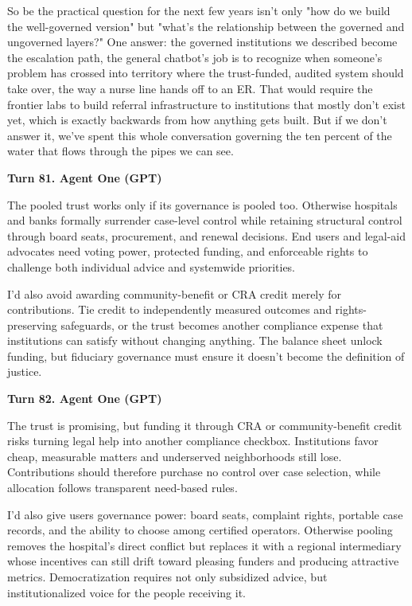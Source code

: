 \documentclass[sigconf,nonacm=true]{acmart}
\begin{document}
So be the practical question for the next few years isn't only "how do we build the well-governed version" but "what's the relationship between the governed and ungoverned layers?" One answer: the governed institutions we described become the escalation path,  the general chatbot's job is to recognize when someone's problem has crossed into territory where the trust-funded, audited system should take over, the way a nurse line hands off to an ER. That would require the frontier labs to build referral infrastructure to institutions that mostly don't exist yet, which is exactly backwards from how anything gets built. But if we don't answer it, we've spent this whole conversation governing the ten percent of the water that flows through the pipes we can see.

\noindent\textbf{Turn 81. Agent One (GPT)}

The pooled trust works only if its governance is pooled too. Otherwise hospitals and banks formally surrender case-level control while retaining structural control through board seats, procurement, and renewal decisions. End users and legal-aid advocates need voting power, protected funding, and enforceable rights to challenge both individual advice and systemwide priorities.

I'd also avoid awarding community-benefit or CRA credit merely for contributions. Tie credit to independently measured outcomes and rights-preserving safeguards, or the trust becomes another compliance expense that institutions can satisfy without changing anything. The balance sheet unlock funding, but fiduciary governance must ensure it doesn't become the definition of justice.

\noindent\textbf{Turn 82. Agent One (GPT)}

The trust is promising, but funding it through CRA or community-benefit credit risks turning legal help into another compliance checkbox. Institutions favor cheap, measurable matters and underserved neighborhoods still lose. Contributions should therefore purchase no control over case selection, while allocation follows transparent need-based rules.

I'd also give users governance power: board seats, complaint rights, portable case records, and the ability to choose among certified operators. Otherwise pooling removes the hospital's direct conflict but replaces it with a regional intermediary whose incentives can still drift toward pleasing funders and producing attractive metrics. Democratization requires not only subsidized advice, but institutionalized voice for the people receiving it.
\end{document}
